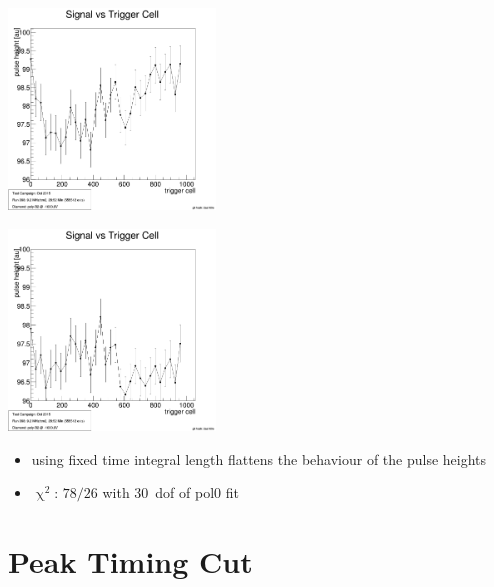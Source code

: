\documentclass[9pt]{beamer}
\begin{document}
\begin{frame}
	\begin{minipage}{5.5cm}
		\centering
		\includegraphics[width=5.5cm]{SignalVsTriggerCell}
	\end{minipage}
	\hspace*{2pt}
	\begin{minipage}{5.5cm}
		\centering
		\includegraphics[width=5.5cm]{SignalVsTrig}
	\end{minipage}\s
	\begin{itemize}
		\item using fixed time integral length flattens the behaviour of the pulse heights
		\item $\upchi^{2}$: $78/26$ with \SI{30}{dof} of pol0 fit
	\end{itemize}
\end{frame}
\section{Peak Timing Cut}
\end{document}
